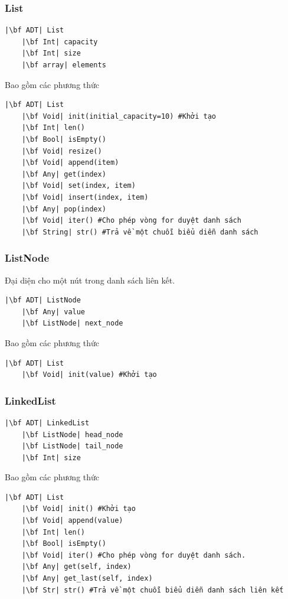 \subsubsection{List}
\begin{verbatim}
|\bf ADT| List
    |\bf Int| capacity
    |\bf Int| size
    |\bf array| elements
\end{verbatim}
Bao gồm các phương thức
\begin{verbatim}
|\bf ADT| List
    |\bf Void| init(initial_capacity=10) #Khởi tạo
    |\bf Int| len()
    |\bf Bool| isEmpty()
    |\bf Void| resize()
    |\bf Void| append(item)
    |\bf Any| get(index)
    |\bf Void| set(index, item)
    |\bf Void| insert(index, item)
    |\bf Any| pop(index)
    |\bf Void| iter() #Cho phép vòng for duyệt danh sách
    |\bf String| str() #Trả về một chuỗi biểu diễn danh sách
\end{verbatim}

\subsubsection{ListNode}
 Đại diện cho một nút trong danh sách liên kết.
\begin{verbatim}
|\bf ADT| ListNode
    |\bf Any| value
    |\bf ListNode| next_node
\end{verbatim}
Bao gồm các phương thức
\begin{verbatim}
|\bf ADT| List
    |\bf Void| init(value) #Khởi tạo
\end{verbatim}

\subsubsection{LinkedList}
\begin{verbatim}
|\bf ADT| LinkedList
    |\bf ListNode| head_node
    |\bf ListNode| tail_node
    |\bf Int| size
\end{verbatim}
Bao gồm các phương thức
\begin{verbatim}
|\bf ADT| List
    |\bf Void| init() #Khởi tạo
    |\bf Void| append(value)
    |\bf Int| len()
    |\bf Bool| isEmpty()
    |\bf Void| iter() #Cho phép vòng for duyệt danh sách.
    |\bf Any| get(self, index)
    |\bf Any| get_last(self, index)
    |\bf Str| str() #Trả về một chuỗi biểu diễn danh sách liên kết 
\end{verbatim}
